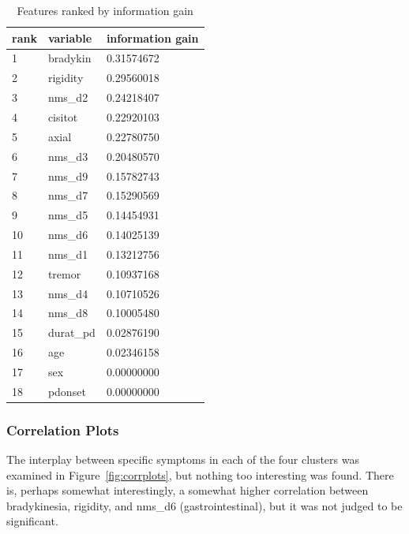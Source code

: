 \documentclass[letterpaper,12pt]{article}
\begin{document}
\begin{table}[h]
  \centering
  \begin{tabular}{l|l|l}
    rank & variable & information gain \\
    \hline
    1 & bradykin      & 0.31574672 \\
    2 & rigidity      & 0.29560018 \\
    3 & nms\_d2      & 0.24218407 \\
    4 & cisitot      & 0.22920103 \\
    5 & axial      & 0.22780750 \\
    6 & nms\_d3      & 0.20480570 \\
    7 & nms\_d9      & 0.15782743 \\
    8 & nms\_d7      & 0.15290569 \\
    9 & nms\_d5      & 0.14454931 \\
    10 & nms\_d6      & 0.14025139 \\
    11 & nms\_d1      & 0.13212756 \\
    12 & tremor      & 0.10937168 \\
    13 & nms\_d4      & 0.10710526 \\
    14 & nms\_d8      & 0.10005480 \\
    15 & durat\_pd      & 0.02876190 \\
    16 & age      & 0.02346158 \\
    17 & sex      & 0.00000000 \\
    18 & pdonset      & 0.00000000 \\
  \end{tabular}
  \caption{Features ranked by information gain}
  \label{tab:info_gain}
\end{table}

\subsubsection{Correlation Plots}

The interplay between specific symptoms in each of the four clusters was
examined in Figure~\ref{fig:corrplots}, but nothing too interesting was found. There is, perhaps somewhat
interestingly, a somewhat higher correlation between bradykinesia, rigidity,
and nms\_d6 (gastrointestinal), but it was not judged to be significant.
\end{document}
